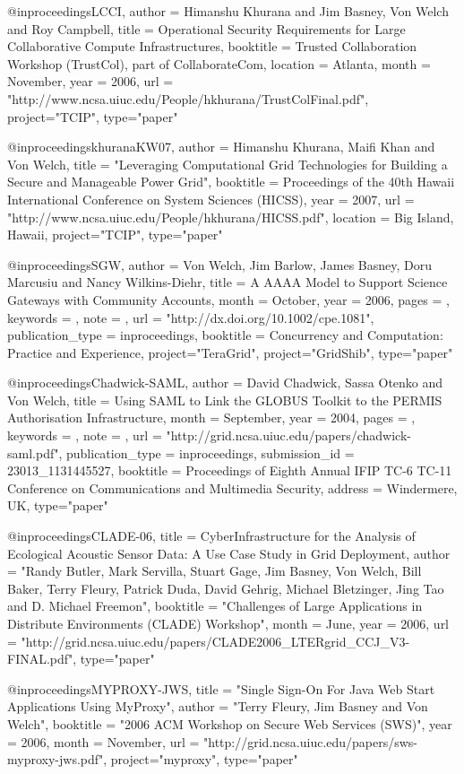 @inproceedings{LCCI,
author = {Himanshu Khurana and Jim Basney, Von Welch and Roy Campbell},
title = {Operational Security Requirements for Large Collaborative Compute Infrastructures},
booktitle = {Trusted Collaboration Workshop (TrustCol), part of CollaborateCom},
location = {Atlanta},
month = {November},
year = {2006},
url = "http://www.ncsa.uiuc.edu/People/hkhurana/TrustColFinal.pdf",
project="TCIP",
type="paper"
}

@inproceedings{khuranaKW07,
author = {Himanshu Khurana, Maifi Khan and Von Welch},
title = "{Leveraging Computational Grid Technologies for Building a Secure and Manageable Power Grid}",
booktitle = {Proceedings of the 40th Hawaii International Conference on System Sciences (HICSS)},
year = {2007},
url = "http://www.ncsa.uiuc.edu/People/hkhurana/HICSS.pdf",
location = {Big Island, Hawaii},
project="TCIP",
type="paper"
}

@inproceedings{SGW,
author = {Von Welch, Jim Barlow, James Basney, Doru Marcusiu and Nancy Wilkins-Diehr},
title = {A AAAA Model to Support Science Gateways with Community Accounts},
month = {October},
year = {2006},
pages = {},
keywords = {},
note = {},
url = "http://dx.doi.org/10.1002/cpe.1081",
publication_type = {inproceedings},
booktitle = {Concurrency and Computation: Practice and Experience},
project="TeraGrid",
project="GridShib",
type="paper"
}

@inproceedings{Chadwick-SAML,
author = {David Chadwick, Sassa Otenko and Von Welch},
title = {{Using SAML to Link the GLOBUS Toolkit to the PERMIS Authorisation Infrastructure}},
month = {September},
year = {2004},
pages = {},
keywords = {},
note = {},
url = "http://grid.ncsa.uiuc.edu/papers/chadwick-saml.pdf",
publication_type = {inproceedings},
submission_id = {23013_1131445527},
booktitle = {Proceedings of Eighth Annual IFIP TC-6 TC-11 Conference on Communications and Multimedia Security},
address = {Windermere, UK},
type="paper"
}

@inproceedings{CLADE-06,
title   = {CyberInfrastructure for the Analysis of Ecological Acoustic Sensor Data: A Use Case Study in Grid Deployment},
author = "Randy Butler, Mark Servilla, Stuart Gage, Jim Basney, Von Welch, Bill Baker, Terry Fleury, Patrick Duda, David Gehrig, Michael Bletzinger, Jing Tao and D. Michael Freemon",
booktitle = "Challenges of Large Applications in Distribute Environments (CLADE) Workshop",
month = {June},
year = {2006},
url = "http://grid.ncsa.uiuc.edu/papers/CLADE2006_LTERgrid_CCJ_V3-FINAL.pdf",
type="paper"
}

@inproceedings{MYPROXY-JWS,
title   = "{S}ingle {S}ign-{O}n {F}or {J}ava {W}eb {S}tart {A}pplications {U}sing {M}y{P}roxy",
author = "Terry Fleury, Jim Basney and Von Welch",
booktitle = "2006 ACM Workshop on Secure Web Services (SWS)",
year = {2006},
month = {November},
url = "http://grid.ncsa.uiuc.edu/papers/sws-myproxy-jws.pdf",
project="myproxy",
type="paper"
}

